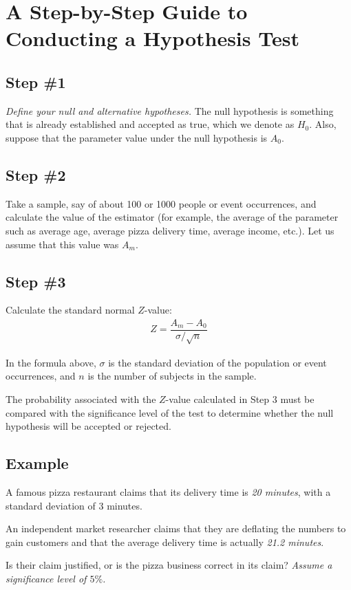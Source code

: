 \section*{A Step-by-Step Guide to Conducting a Hypothesis Test}
\subsection*{Step \#1}
\emph{Define your null and alternative hypotheses.} The null hypothesis is something that is already established and accepted as true, which we denote as $H_{0}.$ Also, suppose that the parameter value under the null hypothesis is $A_{0}.$

\subsection*{Step \#2}
Take a sample, say of about 100 or 1000 people or event occurrences, and calculate the value of the estimator (for example, the average of the parameter such as average age, average pizza delivery time, average income, etc.). Let us assume that this value was $A_{m}.$

\subsection*{Step \#3}
Calculate the standard normal $Z$-value:
\begin{align}
	Z=\dfrac{A_{m}-A_{0}}{\sigma/\sqrt{n}}
\end{align}

In the formula above, $\sigma$ is the standard deviation of the population or event occurrences, and $n$ is the number of subjects in the sample.

The probability associated with the $Z$-value calculated in Step $3$ must be compared with the significance level of the test to determine whether the null hypothesis will be accepted or rejected.

\subsection*{Example}
A famous pizza restaurant claims that its delivery time is \emph{20 minutes}, with a standard deviation of 3 minutes. 

An independent market researcher claims that they are deflating the numbers to gain customers and that the average delivery time is actually \emph{21.2 minutes}.

Is their claim justified, or is the pizza business correct in its claim? \emph{Assume a significance level of $5\%$.}

